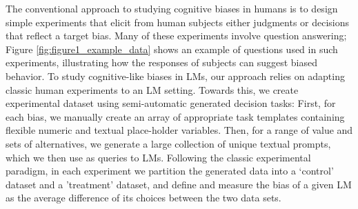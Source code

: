 The conventional approach to studying cognitive biases in humans is to design simple experiments that elicit from human subjects either judgments or decisions that reflect a target bias.
Many of these experiments involve question answering;
Figure \ref{fig:figure1_example_data} shows an example of questions used in such experiments,
illustrating how the responses of subjects can suggest biased behavior.
To study cognitive-like biases in LMs, our approach relies on 
adapting classic human experiments to an LM setting.
Towards this, we create experimental dataset using semi-automatic generated decision tasks:
First, for each bias, we manually create an array of appropriate task templates containing flexible numeric and textual place-holder variables.
Then, for a range of value and sets of alternatives, we generate a large collection of unique textual prompts, which we then use as queries to LMs.
Following the classic experimental paradigm,
in each experiment we partition the generated data into a `control' dataset and a 'treatment' dataset, and define and measure the bias of a given LM as the average difference of its choices between the two data sets.





